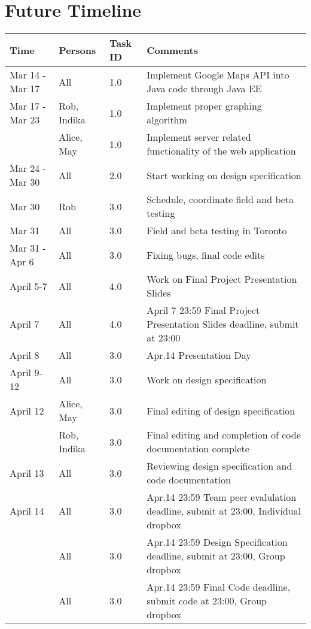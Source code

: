 \documentclass[10pt]{article}
\begin{document}
\section{Future Timeline}
 \begin{tabular}{|p{2cm}|   p{1cm}| p{1.5cm}| p{12cm}|} 
 \hline
Time & Persons  & Task ID & Comments    \\  
 \hline
 
  Mar 14 -  Mar 17 & All & 1.0  & Implement Google Maps API into Java code through Java EE  \\ \hline
   
  Mar 17 -  Mar 23 & Rob, Indika & 1.0  & Implement proper graphing algorithm  \\ \hline
  
 & Alice, May & 1.0  & Implement server related functionality of the web application   \\
 \hline
 
  Mar 24 - Mar 30 & All  & 2.0  & Start working on design specification   \\ \hline
  
     Mar 30 & Rob & 3.0  & Schedule, coordinate field and beta testing  \\
 \hline
     Mar 31 & All  & 3.0  & Field and beta testing in Toronto  \\
 \hline
 
  Mar 31 - Apr 6 & All  & 3.0  & Fixing bugs, final code edits  \\
 \hline
 
 
   April 5-7 & All  & 4.0  & Work on Final Project Presentation Slides \\ \hline
 
   April 7 & All  & 4.0  & April 7 23:59 Final Project Presentation Slides  deadline, submit at 23:00  \\ \hline

  April 8 & All  & 3.0  & Apr.14 Presentation Day \\
 \hline
 
   April 9-12 & All  & 3.0  & Work on design specification  \\
 \hline
 
  April 12 & Alice, May  & 3.0  & Final editing of design specification  \\
 \hline
 
    & Rob, Indika  & 3.0  & Final editing and completion of  code documentation complete \\
 \hline
 
    April 13 & All  & 3.0  & Reviewing design specification and code documentation \\
 \hline
 
  April 14 & All  & 3.0  & Apr.14 23:59 Team peer evalulation deadline, submit at 23:00, Individual dropbox     \\
 \hline

   & All  & 3.0  & Apr.14 23:59 Design Specification deadline, submit at 23:00, Group dropbox     \\
 \hline
  
   & All  & 3.0  & Apr.14 23:59 Final Code deadline, submit code at 23:00, Group dropbox    \\
 \hline


\end{tabular}
\end{document}
